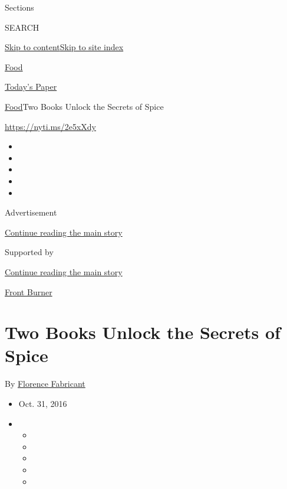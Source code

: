 Sections

SEARCH

\protect\hyperlink{site-content}{Skip to
content}\protect\hyperlink{site-index}{Skip to site index}

\href{https://www.nytimes3xbfgragh.onion/section/food}{Food}

\href{https://myaccount.nytimes3xbfgragh.onion/auth/login?response_type=cookie\&client_id=vi}{}

\href{https://www.nytimes3xbfgragh.onion/section/todayspaper}{Today's
Paper}

\href{/section/food}{Food}\textbar{}Two Books Unlock the Secrets of
Spice

\url{https://nyti.ms/2e5xXdy}

\begin{itemize}
\item
\item
\item
\item
\item
\end{itemize}

Advertisement

\protect\hyperlink{after-top}{Continue reading the main story}

Supported by

\protect\hyperlink{after-sponsor}{Continue reading the main story}

\href{/column/front-burner}{Front Burner}

\hypertarget{two-books-unlock-the-secrets-of-spice}{%
\section{Two Books Unlock the Secrets of
Spice}\label{two-books-unlock-the-secrets-of-spice}}

By
\href{http://www.nytimes3xbfgragh.onion/by/florence-fabricant}{Florence
Fabricant}

\begin{itemize}
\item
  Oct. 31, 2016
\item
  \begin{itemize}
  \item
  \item
  \item
  \item
  \item
  \end{itemize}
\end{itemize}

